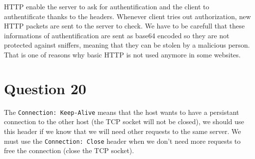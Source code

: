 \documentclass[a4paper,11pt,final]{report}
\begin{document}
HTTP enable the server to ask for authentification and the client to authentificate thanks to the headers. Whenever client tries out authorization, new HTTP packets are sent to the server to check. We have to be carefull that these informations of authentification are sent as base64 encoded so they are not protected against sniffers, meaning that they can be stolen by a malicious person. That is one of reasons why basic HTTP is not used anymore in some websites.

\chapter{Question 20}

The \texttt{Connection: Keep-Alive} means that the host wants to have a persistant connection to the other host (the TCP socket will not be closed), we should use this header if we know that we will need other requests to the same server. We must use the \texttt{Connection: Close} header when we don't need more requests to free the connection (close the TCP socket).
\end{document}
